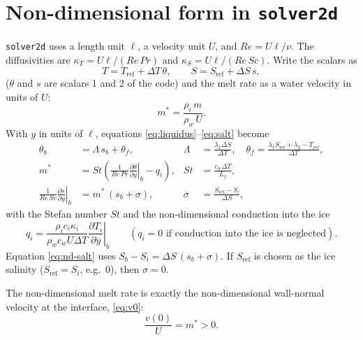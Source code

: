 \documentclass[11pt,a4paper]{article}
\begin{document}
\section{Non-dimensional form in \texttt{solver2d}}

\texttt{solver2d} uses a length unit $\ell$, a velocity unit $U$, and $Re = U\ell/\nu$. The
diffusivities are $\kappa_T = U\ell/(Re\,Pr)$ and $\kappa_S = U\ell/(Re\,Sc)$. Write the scalars as
\begin{equation}
  T = T_{\mathrm{ref}} + \Delta T\, \theta, \qquad S = S_{\mathrm{ref}} + \Delta S\, s ,
\end{equation}
($\theta$ and $s$ are scalars 1 and 2 of the code) and the melt rate as a water velocity in units of
$U$:
\begin{equation}
  m^* = \frac{\rho_i\, m}{\rho_w\, U} .
\end{equation}
With $y$ in units of $\ell$, equations \eqref{eq:liquidus}--\eqref{eq:salt} become
\begin{align}
  \theta_b &= \Lambda\, s_b + \theta_{f}, &
  \Lambda &= \frac{\lambda_1 \Delta S}{\Delta T}, \quad
  \theta_f = \frac{\lambda_1 S_{\mathrm{ref}} + \lambda_2 - T_{\mathrm{ref}}}{\Delta T},
  \label{eq:nd-liquidus}\\[0.4em]
  m^* &= St \left( \frac{1}{Re\,Pr} \left.\frac{\partial \theta}{\partial y}\right|_b - q_i \right), &
  St &= \frac{c_w \Delta T}{L_f},
  \label{eq:nd-heat}\\[0.4em]
  \frac{1}{Re\,Sc} \left.\frac{\partial s}{\partial y}\right|_b &= m^*\, (s_b + \sigma), &
  \sigma &= \frac{S_{\mathrm{ref}} - S_i}{\Delta S},
  \label{eq:nd-salt}
\end{align}
with the Stefan number $St$ and the non-dimensional conduction into the ice
\begin{equation}
  q_i = \frac{\rho_i c_i \kappa_i}{\rho_w c_w U \Delta T} \left.\frac{\partial T_i}{\partial y}\right|_b
  \qquad (q_i = 0 \text{ if conduction into the ice is neglected}).
\end{equation}
Equation \eqref{eq:nd-salt} uses $S_b - S_i = \Delta S\,(s_b + \sigma)$. If $S_{\mathrm{ref}}$ is
chosen as the ice salinity ($S_{\mathrm{ref}} = S_i$, e.g.\ $0$), then $\sigma = 0$.

The non-dimensional melt rate is exactly the non-dimensional wall-normal velocity at the interface,
\eqref{eq:v0}:
\begin{equation}
  \frac{v(0)}{U} = m^* > 0 .
\end{equation}
\end{document}
